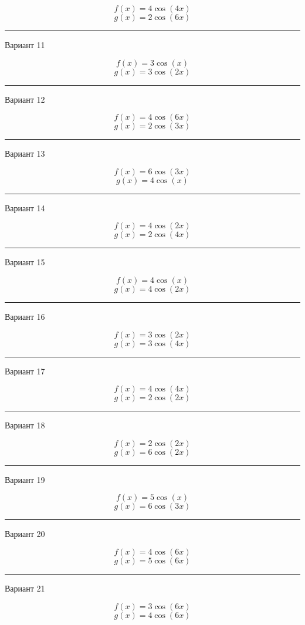\documentclass[11pt]{report}
\begin{document}
$$f(x)=4 \cos{\left(4 x \right)}$$
$$g(x)=2 \cos{\left(6 x \right)}$$

\rule{\textwidth}{.2mm}

Вариант 11

$$f(x)=3 \cos{\left(x \right)}$$
$$g(x)=3 \cos{\left(2 x \right)}$$

\rule{\textwidth}{.2mm}

Вариант 12

$$f(x)=4 \cos{\left(6 x \right)}$$
$$g(x)=2 \cos{\left(3 x \right)}$$

\rule{\textwidth}{.2mm}

Вариант 13

$$f(x)=6 \cos{\left(3 x \right)}$$
$$g(x)=4 \cos{\left(x \right)}$$

\rule{\textwidth}{.2mm}

Вариант 14

$$f(x)=4 \cos{\left(2 x \right)}$$
$$g(x)=2 \cos{\left(4 x \right)}$$

\rule{\textwidth}{.2mm}

Вариант 15

$$f(x)=4 \cos{\left(x \right)}$$
$$g(x)=4 \cos{\left(2 x \right)}$$

\rule{\textwidth}{.2mm}

Вариант 16

$$f(x)=3 \cos{\left(2 x \right)}$$
$$g(x)=3 \cos{\left(4 x \right)}$$

\rule{\textwidth}{.2mm}

Вариант 17

$$f(x)=4 \cos{\left(4 x \right)}$$
$$g(x)=2 \cos{\left(2 x \right)}$$

\rule{\textwidth}{.2mm}

Вариант 18

$$f(x)=2 \cos{\left(2 x \right)}$$
$$g(x)=6 \cos{\left(2 x \right)}$$

\rule{\textwidth}{.2mm}

Вариант 19

$$f(x)=5 \cos{\left(x \right)}$$
$$g(x)=6 \cos{\left(3 x \right)}$$

\rule{\textwidth}{.2mm}

Вариант 20

$$f(x)=4 \cos{\left(6 x \right)}$$
$$g(x)=5 \cos{\left(6 x \right)}$$

\rule{\textwidth}{.2mm}

Вариант 21

$$f(x)=3 \cos{\left(6 x \right)}$$
$$g(x)=4 \cos{\left(6 x \right)}$$
\end{document}
